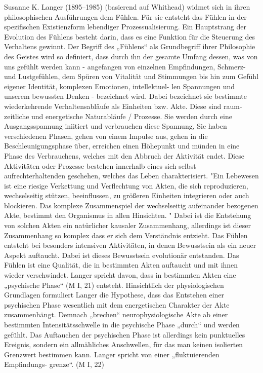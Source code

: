  Susanne K. Langer (1895–1985) (basierend auf Whithead) widmet sich in ihren philosophischen Ausführungen dem Fühlen. Für sie entsteht das Fühlen in der spezifischen Existienzform lebendiger Prozessualisierung.  Ein Hauptstrang der Evolution des Fühlens besteht darin, dass es eine Funktion für die Steuerung des Verhaltens gewinnt. Der  Begriff  des  „Fühlens“  als  Grundbegriff  ihrer  Philosophie  des  Geistes wird so definiert, dass durch ihn der gesamte Umfang dessen, was von uns gefühlt werden kann - angefangen von einzelnen Empfindungen, 
Schmerz-  und  Lustgefühlen,  dem  Spüren  von  Vitalität  und  Stimmungen  
bis hin zum Gefühl eigener Identität, komplexen Emotionen, intellektuel-
len  Spannungen  und  unserem  bewussten  Denken  -  bezeichnet  wird. 
 Dabei bezeichnet sie bestimmte wiederkehrende Verhaltensabläufe als Einheiten bzw. Akte. Diese sind raum-zeitliche und energetische Naturabläufe / Prozesse. Sie werden durch eine Ausgangsspannung iniitiert und verbrauchen diese Spannung, Sie haben verschiedenen Phasen, gehen von einem Impulse aus, gehen in die Beschleunigungsphase über, erreichen einen Höhepunkt und münden in eine Phase des Verbrauchens, welches mit den Abbruch der Aktivität endet. Diese Aktivitäten oder Prozesse bestehen innerhalb eines sich selbst aufrechterhaltenden geschehen, welches das Leben charakterisiert. "Ein  Lebewesen  ist  eine  riesige  Verkettung  und  Verflechtung  von  Akten,  die  sich  reproduzieren,  wechselseitig  stützen,  beeinflussen,  zu  größeren  Einheiten  integrieren  oder  auch  blockieren.  Das  komplexe  Zusammenspiel  der  wechselseitig  aufeinander  bezogenen Akte, bestimmt den Organismus in allen Hinsichten. " Dabei ist die Entstehung von solchen Akten ein natürlicher kausaler Zusammenhang, allerdings ist dieser Zusammenhang so komplex dass er sich dem Verständnis entzieht. Das Fühlen entsteht bei besonders intensiven Aktivitäten, in denen Bewusstsein als ein neuer Aspekt auftaucht. Dabei ist dieses Bewusstsein evolutionär entstanden.  Das  Fühlen ist  eine  Qualität,  die  in  bestimmten  Akten  auftaucht und  mit  ihnen  wieder  verschwindet.  Langer  spricht  davon,  dass  in  bestimmten Akten eine „psychische Phase“ (M I, 21) entsteht. Hinsichtlich  der  physiologischen  Grundlagen  formuliert  Langer  die Hypothese,  dass  das  Entstehen  einer  psychischen  Phase  wesentlich  mit  
dem  energetischen  Charakter  der  Akte  zusammenhängt.  Demnach  „brechen“  neurophysiologische  Akte  ab  einer  bestimmten  Intensitätsschwelle  
in die psychische Phase „durch“ und werden gefühlt. Das Auftauchen der 
psychischen  Phase  ist  allerdings  kein  punktuelles  Ereignis,  sondern  ein  
allmähliches  Anschwellen,  für  das  man  keinen  isolierten  Grenzwert  bestimmen  kann.  Langer  spricht  von  einer  „fluktuierenden  Empfindungs-
grenze“. (M I, 22) 

